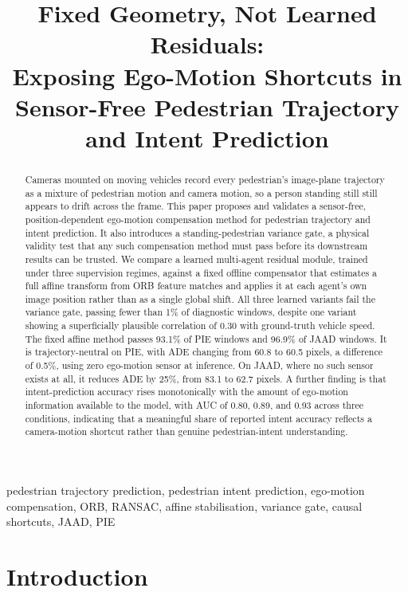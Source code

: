 \documentclass[conference]{IEEEtran}
\title{Fixed Geometry, Not Learned Residuals:\\
Exposing Ego-Motion Shortcuts in Sensor-Free Pedestrian Trajectory and Intent Prediction}
\author{\IEEEauthorblockN{}
\IEEEauthorblockA{}}
\begin{document}
\maketitle

\begin{abstract}
Cameras mounted on moving vehicles record every pedestrian's image-plane trajectory as a mixture of pedestrian motion and camera motion, so a person standing still still appears to drift across the frame. This paper proposes and validates a sensor-free, position-dependent ego-motion compensation method for pedestrian trajectory and intent prediction. It also introduces a standing-pedestrian variance gate, a physical validity test that any such compensation method must pass before its downstream results can be trusted. We compare a learned multi-agent residual module, trained under three supervision regimes, against a fixed offline compensator that estimates a full affine transform from ORB feature matches and applies it at each agent's own image position rather than as a single global shift. All three learned variants fail the variance gate, passing fewer than 1\% of diagnostic windows, despite one variant showing a superficially plausible correlation of 0.30 with ground-truth vehicle speed. The fixed affine method passes 93.1\% of PIE windows and 96.9\% of JAAD windows. It is trajectory-neutral on PIE, with ADE changing from 60.8 to 60.5 pixels, a difference of 0.5\%, using zero ego-motion sensor at inference. On JAAD, where no such sensor exists at all, it reduces ADE by 25\%, from 83.1 to 62.7 pixels. A further finding is that intent-prediction accuracy rises monotonically with the amount of ego-motion information available to the model, with AUC of 0.80, 0.89, and 0.93 across three conditions, indicating that a meaningful share of reported intent accuracy reflects a camera-motion shortcut rather than genuine pedestrian-intent understanding.
\end{abstract}

\begin{IEEEkeywords}
pedestrian trajectory prediction, pedestrian intent prediction, ego-motion compensation, ORB, RANSAC, affine stabilisation, variance gate, causal shortcuts, JAAD, PIE
\end{IEEEkeywords}

\section{Introduction}
\end{document}
